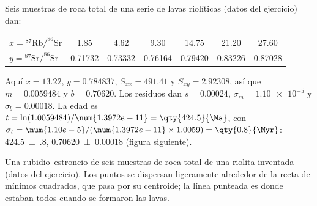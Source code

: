 \begin{example}\label{ex:b1:radiometric-methods:rhyolite}
Seis muestras de roca total de una serie de lavas riolíticas (datos del ejercicio) dan:
\begin{center}
\small
\begin{tabular}{|l|cccccc|}
\hline
$x = {}^{87}\mathrm{Rb}/^{86}\mathrm{Sr}$ & 1.85 & 4.62 & 9.30 & 14.75 & 21.20 & 27.60 \\
$y = {}^{87}\mathrm{Sr}/^{86}\mathrm{Sr}$ & 0.71732 & 0.73332 & 0.76164 & 0.79420 & 0.83226 & 0.87028 \\
\hline
\end{tabular}
\end{center}
Aquí $\bar x = 13.22$, $\bar y = 0.784837$, $S_{xx} = 491.41$ y
$S_{xy} = 2.92308$, así que $m = 0.0059484$ y $b = 0.70620$. Los residuos dan
$s = 0.00024$, $\sigma_m = \num{1.10e-5}$ y $\sigma_b = 0.00018$. La edad es
$t = \ln(1.0059484)/\num{1.3972e-11} = \qty{424.5}{\Ma}$, con
$\sigma_t = \num{1.10e-5}/(\num{1.3972e-11} \times 1.0059) = \qty{0.8}{\Myr}$:
\qty[uncertainty-mode=separate]{424.5(8)}{\Ma}, 
\num[uncertainty-mode=separate]{0.70620(18)} (figura siguiente).
\end{example}

\begin{omfigure}

{\small Una  rubidio--estroncio de seis muestras de roca total de una riolita inventada (datos del ejercicio). Los puntos se dispersan ligeramente alrededor de la recta de mínimos cuadrados, que pasa por su centroide; la línea punteada es donde estaban todos cuando se formaron las lavas.}
\label{fig:b1:radiometric-methods:isochron}
\end{omfigure}

